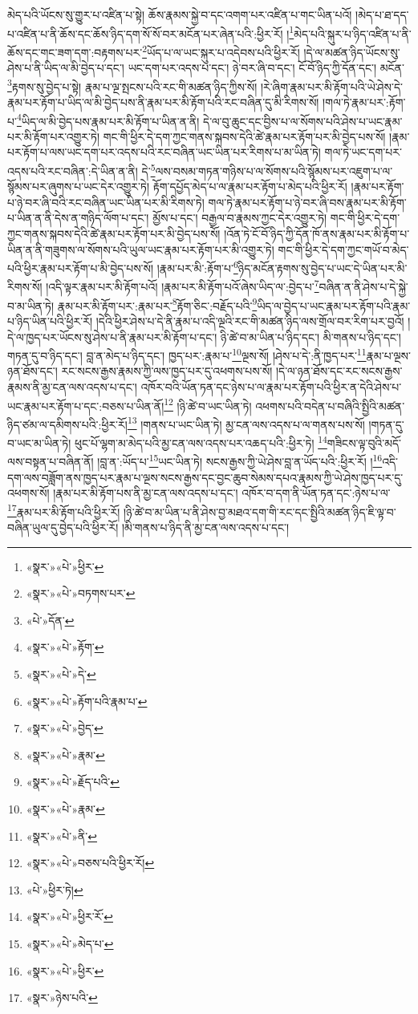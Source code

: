 མེད་པའི་ཡོངས་སུ་གྱུར་པ་འཛིན་པ་སྟེ། ཆོས་རྣམས་སྐྱེ་བ་དང་འགག་པར་འཛིན་པ་གང་ཡིན་པའོ། །མེད་པ་ཐ་དད་པ་འཛིན་པ་ནི་ཆོས་དང་ཆོས་ཉིད་དག་སོ་སོ་བར་མངོན་པར་ཞེན་པའི་:ཕྱིར་རོ། །\footnote{«སྣར་»«པེ་»ཕྱིར་}མེད་པའི་སྐུར་པ་ཉིད་འཛིན་པ་ནི་ཆོས་དང་གང་ཟག་དག་:བརྟགས་པར་\footnote{«སྣར་»«པེ་»བཏགས་པར་}ཡོད་པ་ལ་ཡང་སྐུར་པ་འདེབས་པའི་ཕྱིར་རོ། །དེ་ལ་མཚན་ཉིད་ཡོངས་སུ་ཤེས་པ་ནི་ཡིད་ལ་མི་བྱེད་པ་དང་། ཡང་དག་པར་འདས་པ་དང་། ཉེ་བར་ཞི་བ་དང་། ངོ་བོ་ཉིད་ཀྱི་དོན་དང་། མངོན་\footnote{«པེ་»དོན་}རྟགས་སུ་བྱེད་པ་སྟེ། རྣམ་པ་ལྔ་སྤངས་པའི་རང་གི་མཚན་ཉིད་ཀྱིས་སོ། །རེ་ཞིག་རྣམ་པར་མི་རྟོག་པའི་ཡེ་ཤེས་དེ་རྣམ་པར་རྟོག་པ་ཡིད་ལ་མི་བྱེད་པས་ནི་རྣམ་པར་མི་རྟོག་པའི་རང་བཞིན་དུ་མི་རིགས་སོ། །གལ་ཏེ་རྣམ་པར་:རྟོག་པ་\footnote{«སྣར་»«པེ་»རྟོག་}ཡིད་ལ་མི་བྱེད་པས་རྣམ་པར་མི་རྟོག་པ་ཡིན་ན་ནི། དེ་ལ་བུ་ཆུང་དང་བྱིས་པ་ལ་སོགས་པའི་ཤེས་པ་ཡང་རྣམ་པར་མི་རྟོག་པར་འགྱུར་ཏེ། གང་གི་ཕྱིར་དེ་དག་ཀྱང་གནས་སྐབས་དེའི་ཚེ་རྣམ་པར་རྟོག་པར་མི་བྱེད་པས་སོ། །རྣམ་པར་རྟོག་པ་ལས་ཡང་དག་པར་འདས་པའི་རང་བཞིན་ཡང་ཡིན་པར་རིགས་པ་མ་ཡིན་ཏེ། གལ་ཏེ་ཡང་དག་པར་འདས་པའི་རང་བཞིན་:དེ་ཡིན་ན་ནི། དེ་\footnote{«སྣར་»«པེ་»དེ་}ལས་བསམ་གཏན་གཉིས་པ་ལ་སོགས་པའི་སྙོམས་པར་འཇུག་པ་ལ་སྙོམས་པར་ཞུགས་པ་ཡང་དེར་འགྱུར་ཏེ། རྟོག་དཔྱོད་མེད་པ་ལ་རྣམ་པར་རྟོག་པ་མེད་པའི་ཕྱིར་རོ། །རྣམ་པར་རྟོག་པ་ཉེ་བར་ཞི་བའི་རང་བཞིན་ཡང་ཡིན་པར་མི་རིགས་ཏེ། གལ་ཏེ་རྣམ་པར་རྟོག་པ་ཉེ་བར་ཞི་བས་རྣམ་པར་མི་རྟོག་པ་ཡིན་ན་ནི་དེས་ན་གཉིད་ལོག་པ་དང་། མྱོས་པ་དང་། བརྒྱལ་བ་རྣམས་ཀྱང་དེར་འགྱུར་ཏེ། གང་གི་ཕྱིར་དེ་དག་ཀྱང་གནས་སྐབས་དེའི་ཚེ་རྣམ་པར་རྟོག་པར་མི་བྱེད་པས་སོ། །འོན་ཏེ་ངོ་བོ་ཉིད་ཀྱི་དོན་ཁོ་ནས་རྣམ་པར་མི་རྟོག་པ་ཡིན་ན་ནི་གཟུགས་ལ་སོགས་པའི་ཡུལ་ཡང་རྣམ་པར་རྟོག་པར་མི་འགྱུར་ཏེ། གང་གི་ཕྱིར་དེ་དག་ཀྱང་གཡོ་བ་མེད་པའི་ཕྱིར་རྣམ་པར་རྟོག་པ་མི་བྱེད་པས་སོ། །རྣམ་པར་མི་:རྟོག་པ་\footnote{«སྣར་»«པེ་»རྟོག་པའི་རྣམ་པ་}ཉིད་མངོན་རྟགས་སུ་བྱེད་པ་ཡང་དེ་ཡིན་པར་མི་རིགས་སོ། །འདི་ལྟར་རྣམ་པར་མི་རྟོག་པའོ། །རྣམ་པར་མི་རྟོག་པའོ་ཞེས་ཡིད་ལ་:བྱེད་པ་\footnote{«སྣར་»«པེ་»བྱེད་}བཞིན་ན་ནི་ཤེས་པ་དེ་སྐྱེ་བ་མ་ཡིན་ཏེ། རྣམ་པར་མི་རྟོག་པར་:རྣམ་པར་\footnote{«སྣར་»«པེ་»རྣམ་}རྟོག་ཅིང་:བརྗོད་པའི་\footnote{«སྣར་»«པེ་»རྗོད་པའི་}ཡིད་ལ་བྱེད་པ་ཡང་རྣམ་པར་རྟོག་པའི་རྣམ་པ་ཉིད་ཡིན་པའི་ཕྱིར་རོ། །དེའི་ཕྱིར་ཤེས་པ་དེ་ནི་རྣམ་པ་འདི་ལྔའི་རང་གི་མཚན་ཉིད་ལས་གྲོལ་བར་རིག་པར་བྱའོ། །དེ་ལ་ཁྱད་པར་ཡོངས་སུ་ཤེས་པ་ནི་རྣམ་པར་མི་རྟོག་པ་དང་། ཉི་ཚེ་བ་མ་ཡིན་པ་ཉིད་དང་། མི་གནས་པ་ཉིད་དང་། གཏན་དུ་བ་ཉིད་དང་། བླ་ན་མེད་པ་ཉིད་དང་། ཁྱད་པར་:རྣམ་པ་\footnote{«སྣར་»«པེ་»རྣམ་}ལྔས་སོ། །ཤེས་པ་དེ་:ནི་ཁྱད་པར་\footnote{«སྣར་»«པེ་»ནི་}རྣམ་པ་ལྔས་ཉན་ཐོས་དང་། རང་སངས་རྒྱས་རྣམས་ཀྱི་ལས་ཁྱད་པར་དུ་འཕགས་པས་སོ། །དེ་ལ་ཉན་ཐོས་དང་རང་སངས་རྒྱས་རྣམས་ནི་མྱ་ངན་ལས་འདས་པ་དང་། འཁོར་བའི་ཡོན་ཏན་དང་ཉེས་པ་ལ་རྣམ་པར་རྟོག་པའི་ཕྱིར་ན་དེའི་ཤེས་པ་ཡང་རྣམ་པར་རྟོག་པ་དང་:བཅས་པ་ཡིན་ནོ།\footnote{«སྣར་»«པེ་»བཅས་པའི་ཕྱིར་རོ།} །ཉི་ཚེ་བ་ཡང་ཡིན་ཏེ། འཕགས་པའི་བདེན་པ་བཞིའི་སྤྱིའི་མཚན་ཉིད་ཙམ་ལ་དམིགས་པའི་:ཕྱིར་རོ།\footnote{«པེ་»ཕྱིར་ཏེ།} །གནས་པ་ཡང་ཡིན་ཏེ། མྱ་ངན་ལས་འདས་པ་ལ་གནས་པས་སོ། །གཏན་དུ་བ་ཡང་མ་ཡིན་ཏེ། ཕུང་པོ་ལྷག་མ་མེད་པའི་མྱ་ངན་ལས་འདས་པར་འཆད་པའི་:ཕྱིར་ཏེ། \footnote{«སྣར་»«པེ་»ཕྱིར་རོ་}གཟིངས་ལྟ་བུའི་མདོ་ལས་བསྟན་པ་བཞིན་ནོ། །བླ་ན་:ཡོད་པ་\footnote{«སྣར་»«པེ་»མེད་པ་}ཡང་ཡིན་ཏེ། སངས་རྒྱས་ཀྱི་ཡེ་ཤེས་བླ་ན་ཡོད་པའི་:ཕྱིར་རོ། །\footnote{«སྣར་»«པེ་»ཕྱིར་}འདི་དག་ལས་བཟློག་ནས་ཁྱད་པར་རྣམ་པ་ལྔས་སངས་རྒྱས་དང་བྱང་ཆུབ་སེམས་དཔའ་རྣམས་ཀྱི་ཡེ་ཤེས་ཁྱད་པར་དུ་འཕགས་སོ། །རྣམ་པར་མི་རྟོག་པས་ནི་མྱ་ངན་ལས་འདས་པ་དང་། འཁོར་བ་དག་ནི་ཡོན་ཏན་དང་:ཉེས་པ་ལ་\footnote{«སྣར་»ཉེས་པའི་}རྣམ་པར་མི་རྟོག་པའི་ཕྱིར་རོ། །ཉི་ཚེ་བ་མ་ཡིན་པ་ནི་ཤེས་བྱ་མཐའ་དག་གི་རང་དང་སྤྱིའི་མཚན་ཉིད་ཇི་ལྟ་བ་བཞིན་ཡུལ་དུ་བྱེད་པའི་ཕྱིར་རོ། །མི་གནས་པ་ཉིད་ནི་མྱ་ངན་ལས་འདས་པ་དང་། 